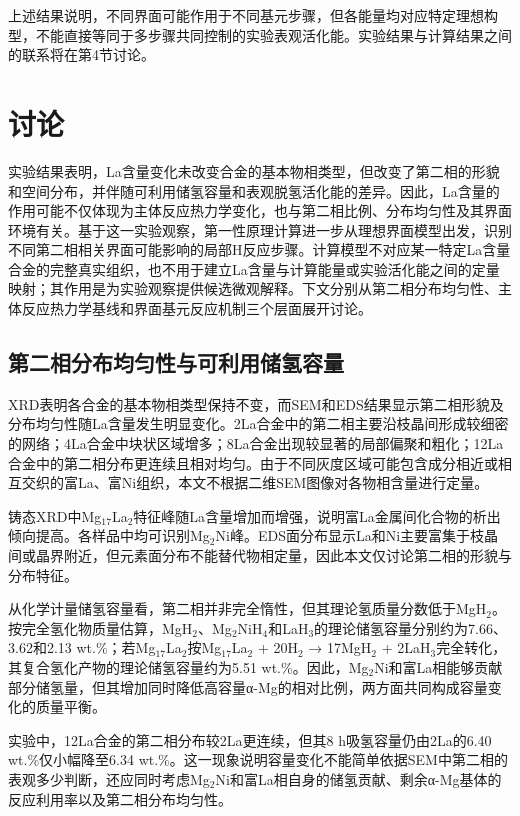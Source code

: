 \documentclass[preprint,12pt]{elsarticle}
\begin{document}
上述结果说明，不同界面可能作用于不同基元步骤，但各能量均对应特定理想构型，不能直接等同于多步骤共同控制的实验表观活化能。实验结果与计算结果之间的联系将在第4节讨论。

\section{讨论}

实验结果表明，La含量变化未改变合金的基本物相类型，但改变了第二相的形貌和空间分布，并伴随可利用储氢容量和表观脱氢活化能的差异。因此，La含量的作用可能不仅体现为主体反应热力学变化，也与第二相比例、分布均匀性及其界面环境有关。基于这一实验观察，第一性原理计算进一步从理想界面模型出发，识别不同第二相相关界面可能影响的局部H反应步骤。计算模型不对应某一特定La含量合金的完整真实组织，也不用于建立La含量与计算能量或实验活化能之间的定量映射；其作用是为实验观察提供候选微观解释。下文分别从第二相分布均匀性、主体反应热力学基线和界面基元反应机制三个层面展开讨论。

\subsection{第二相分布均匀性与可利用储氢容量}

XRD表明各合金的基本物相类型保持不变，而SEM和EDS结果显示第二相形貌及分布均匀性随La含量发生明显变化。2La合金中的第二相主要沿枝晶间形成较细密的网络；4La合金中块状区域增多；8La合金出现较显著的局部偏聚和粗化；12La合金中的第二相分布更连续且相对均匀。由于不同灰度区域可能包含成分相近或相互交织的富La、富Ni组织，本文不根据二维SEM图像对各物相含量进行定量。

铸态XRD中Mg$_{\mathrm{17}}$La$_{\mathrm{2}}$特征峰随La含量增加而增强，说明富La金属间化合物的析出倾向提高。各样品中均可识别Mg$_{\mathrm{2}}$Ni峰。EDS面分布显示La和Ni主要富集于枝晶间或晶界附近，但元素面分布不能替代物相定量，因此本文仅讨论第二相的形貌与分布特征。

从化学计量储氢容量看，第二相并非完全惰性，但其理论氢质量分数低于MgH$_{\mathrm{2}}$。按完全氢化物质量估算，MgH$_{\mathrm{2}}$、Mg$_{\mathrm{2}}$NiH$_{\mathrm{4}}$和LaH$_{\mathrm{3}}$的理论储氢容量分别约为7.66、3.62和2.13 wt.\%；若Mg$_{\mathrm{17}}$La$_{\mathrm{2}}$按Mg$_{\mathrm{17}}$La$_{\mathrm{2}}$ + 20H$_{\mathrm{2}}$ → 17MgH$_{\mathrm{2}}$ + 2LaH$_{\mathrm{3}}$完全转化，其复合氢化产物的理论储氢容量约为5.51 wt.\%。因此，Mg$_{\mathrm{2}}$Ni和富La相能够贡献部分储氢量，但其增加同时降低高容量α-Mg的相对比例，两方面共同构成容量变化的质量平衡。

实验中，12La合金的第二相分布较2La更连续，但其8 h吸氢容量仍由2La的6.40 wt.\%仅小幅降至6.34 wt.\%。这一现象说明容量变化不能简单依据SEM中第二相的表观多少判断，还应同时考虑Mg$_{\mathrm{2}}$Ni和富La相自身的储氢贡献、剩余α-Mg基体的反应利用率以及第二相分布均匀性。
\end{document}
